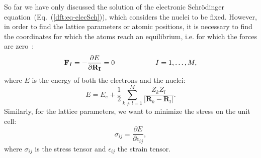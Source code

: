 \begin{refsection}
So far we have only discussed the solution of the electronic Schr\"odinger 
equation~(Eq.~(\ref{dft:eq-elecSch})), which considers the nuclei to be 
fixed. However, in order to find the lattice parameters or atomic positions, it 
is necessary to find the coordinates for which the atoms reach an equilibrium, 
i.e. for which the forces are zero~\cite{Martin2004}: 
\begin{equation} \label{dft:eq-force} 
\mathbf{F}_I = - \frac{\partial E}{\partial \mathbf{R_I}} = 0 \hspace{0.8in} I 
= 1,\hdots, M, 
\end{equation} 
where $E$ is the energy of both the electrons and the nuclei: 
\begin{equation} 
E = E_e + \frac{1}{2} \sum_{k\neq l = 1}^{M}\frac{Z_k Z_l}{\left| \mathbf{R}_k 
- \mathbf{R}_l \right|}. 
\end{equation} 
Similarly, for the lattice parameters, we want to minimize the stress on the unit cell:
\begin{equation} \label{dft:eq-stress}
\sigma_{ij} = \frac{\partial E}{\partial \epsilon_{ij}},
\end{equation}
where $\sigma_{ij}$ is the stress tensor and $\epsilon_{ij}$ the strain tensor.


\end{refsection}

